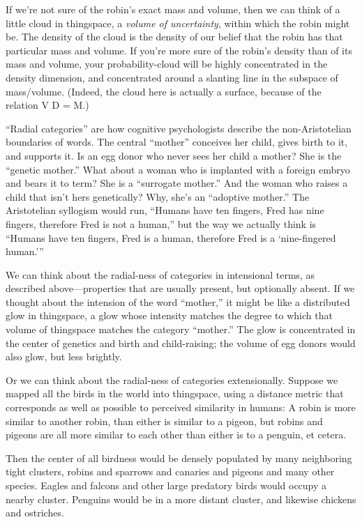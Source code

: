 {
 If we're not sure of the robin's
exact mass and volume, then we can think of a little cloud in
thingspace, a \textit{volume of uncertainty}, within which the robin
might be. The density of the cloud is the density of our belief that
the robin has that particular mass and volume. If
you're more sure of the robin's density
than of its mass and volume, your probability-cloud will be highly
concentrated in the density dimension, and concentrated around a
slanting line in the subspace of mass/volume. (Indeed, the cloud here
is actually a surface, because of the relation V D = M.)}

{
 ``Radial categories'' are how
cognitive psychologists describe the non-Aristotelian boundaries of
words. The central ``mother''
conceives her child, gives birth to it, and supports it. Is an egg
donor who never sees her child a mother? She is the
``genetic mother.'' What about a
woman who is implanted with a foreign embryo and bears it to term? She
is a ``surrogate mother.'' And the
woman who raises a child that isn't hers genetically?
Why, she's an ``adoptive
mother.'' The Aristotelian syllogism would run,
``Humans have ten fingers, Fred has nine fingers,
therefore Fred is not a human,'' but the way we
actually think is ``Humans have ten fingers, Fred is a
human, therefore Fred is a `nine-fingered
human.'''}

{
 We can think about the radial-ness of categories in intensional
terms, as described above---properties that are usually present, but
optionally absent. If we thought about the intension of the word
``mother,'' it might be like a
distributed glow in thingspace, a glow whose intensity matches the
degree to which that volume of thingspace matches the category
``mother.'' The glow is concentrated
in the center of genetics and birth and child-raising; the volume of
egg donors would also glow, but less brightly.}

{
 Or we can think about the radial-ness of categories extensionally.
Suppose we mapped all the birds in the world into thingspace, using a
distance metric that corresponds as well as possible to perceived
similarity in humans: A robin is more similar to another robin, than
either is similar to a pigeon, but robins and pigeons are all more
similar to each other than either is to a penguin, et cetera.}

{
 Then the center of all birdness would be densely populated by many
neighboring tight clusters, robins and sparrows and canaries and
pigeons and many other species. Eagles and falcons and other large
predatory birds would occupy a nearby cluster. Penguins would be in a
more distant cluster, and likewise chickens and ostriches.}

